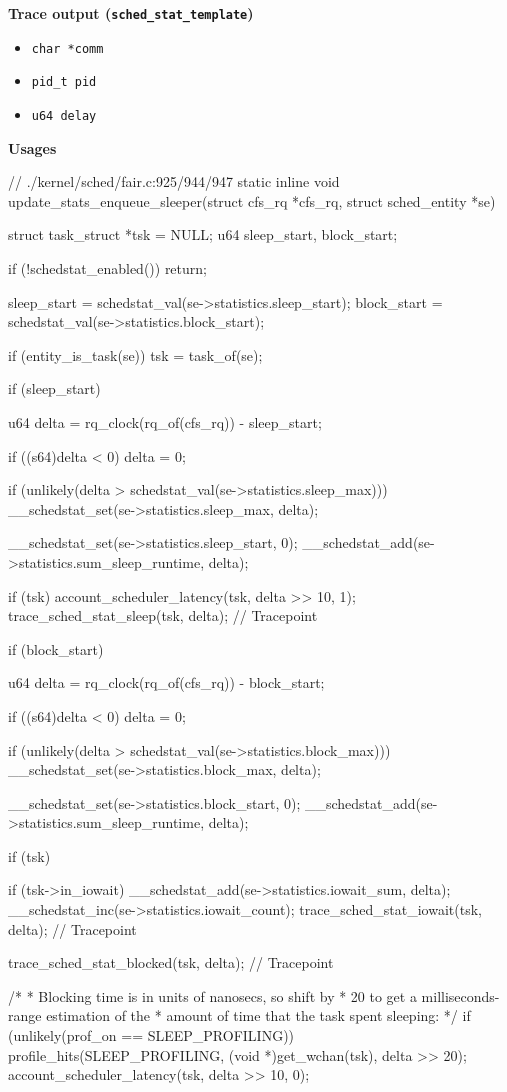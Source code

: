 \textbf{Trace output (\texttt{sched\_stat\_template})}
\begin{itemize}
    \item \verb|char *comm|
    \item \verb|pid_t pid|
    \item \verb|u64 delay|
\end{itemize}

\textbf{Usages}\\
\begin{code}
// ./kernel/sched/fair.c:925/944/947
static inline void
update_stats_enqueue_sleeper(struct cfs_rq *cfs_rq, struct sched_entity *se) {
	struct task_struct *tsk = NULL;
	u64 sleep_start, block_start;

	if (!schedstat_enabled())
		return;

	sleep_start = schedstat_val(se->statistics.sleep_start);
	block_start = schedstat_val(se->statistics.block_start);

	if (entity_is_task(se))
		tsk = task_of(se);

	if (sleep_start) {
		u64 delta = rq_clock(rq_of(cfs_rq)) - sleep_start;

		if ((s64)delta < 0)
			delta = 0;

		if (unlikely(delta > schedstat_val(se->statistics.sleep_max)))
			__schedstat_set(se->statistics.sleep_max, delta);

		__schedstat_set(se->statistics.sleep_start, 0);
		__schedstat_add(se->statistics.sum_sleep_runtime, delta);

		if (tsk) {
			account_scheduler_latency(tsk, delta >> 10, 1);
			trace_sched_stat_sleep(tsk, delta); // Tracepoint
		}
	}
	if (block_start) {
		u64 delta = rq_clock(rq_of(cfs_rq)) - block_start;

		if ((s64)delta < 0)
			delta = 0;

		if (unlikely(delta > schedstat_val(se->statistics.block_max)))
			__schedstat_set(se->statistics.block_max, delta);

		__schedstat_set(se->statistics.block_start, 0);
		__schedstat_add(se->statistics.sum_sleep_runtime, delta);

		if (tsk) {
			if (tsk->in_iowait) {
				__schedstat_add(se->statistics.iowait_sum, delta);
				__schedstat_inc(se->statistics.iowait_count);
				trace_sched_stat_iowait(tsk, delta); // Tracepoint
			}

			trace_sched_stat_blocked(tsk, delta); // Tracepoint

			/*
			 * Blocking time is in units of nanosecs, so shift by
			 * 20 to get a milliseconds-range estimation of the
			 * amount of time that the task spent sleeping:
			 */
			if (unlikely(prof_on == SLEEP_PROFILING)) {
				profile_hits(SLEEP_PROFILING,
						(void *)get_wchan(tsk),
						delta >> 20);
			}
			account_scheduler_latency(tsk, delta >> 10, 0);
		}
	}
}
\end{code}
